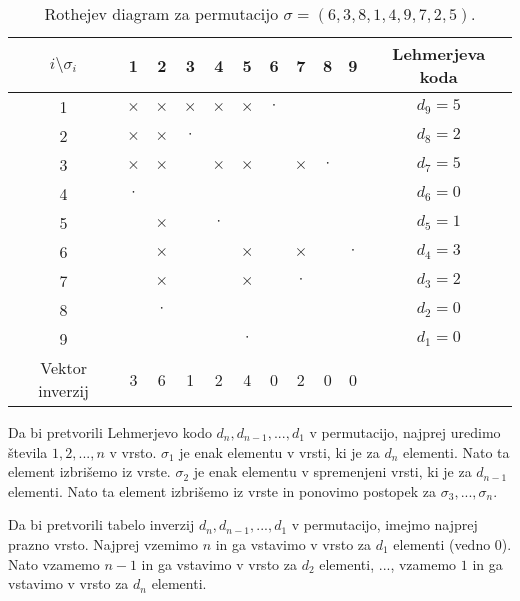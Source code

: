\documentclass[a4paper, 12pt]{book}
\begin{document}
\begin{table}
    \begin{center}
        \begin{tabular}{ |c|c|c|c|c|c|c|c|c|c|c| } 
        \hline
            $i \setminus \sigma_i$ & 1 & 2 & 3 & 4 & 5 & 6 & 7 & 8 & 9 & Lehmerjeva koda  \\ 
        \hline
            1 & $\times$ & $\times$ & $\times$ & $\times$ & $\times$ & $\cdot$ & & & & $d_9 = 5$  \\ 
        \hline
            2 & $\times$ & $\times$ & $\cdot$ & & & & & & & $d_8 = 2$  \\ 
        \hline
            3 & $\times$ & $\times$ & & $\times$ & $\times$ & & $\times$ & $\cdot$ & & $d_7 = 5$  \\ 
        \hline
            4 & $\cdot$ & & & & & & & & & $d_6 = 0$  \\ 
        \hline
            5 & & $\times$ & & $\cdot$ & & & & & & $d_5 = 1$  \\ 
        \hline
            6 & & $\times$ & & & $\times$ & & $\times$ & & $\cdot$ & $d_4 = 3$  \\ 
        \hline
            7 & & $\times$ & & & $\times$ & & $\cdot$ & & & $d_3 = 2$  \\ 
        \hline
            8 & & $\cdot$ & & & & & & & & $d_2 = 0$  \\ 
        \hline
            9 & & & & & $\cdot$ & & & & & $d_1 = 0$  \\ 
        \hline
            Vektor inverzij & 3 & 6 & 1 & 2 & 4 & 0 & 2 & 0 & 0 &  \\ 
        \hline
        \end{tabular}
    \end{center}
    \caption{ Rothejev diagram za permutacijo $\sigma = (6, 3, 8, 1, 4, 9, 7, 2, 5)$. }
    \label{tbl:rothejev_diagram}
\end{table}

Da bi pretvorili Lehmerjevo kodo $d_n, d_{n-1}, ..., d_1$ v permutacijo, najprej uredimo števila $1, 2, ..., n$ v vrsto. $\sigma_1$ je enak elementu v vrsti, ki je za $d_{n}$ elementi. Nato ta element izbrišemo iz vrste. $\sigma_2$ je enak elementu v spremenjeni vrsti, ki je za $d_{n-1}$ elementi. Nato ta element izbrišemo iz vrste in ponovimo postopek za $\sigma_3, ..., \sigma_n$.

Da bi pretvorili tabelo inverzij $d_n, d_{n-1}, ..., d_1$ v permutacijo, imejmo najprej prazno vrsto. Najprej vzemimo $n$ in ga vstavimo v vrsto za $d_1$ elementi (vedno $0$). Nato vzamemo $n-1$ in ga vstavimo v vrsto za $d_{2}$ elementi, ..., vzamemo $1$ in ga vstavimo v vrsto za $d_{n}$ elementi.
\end{document}
